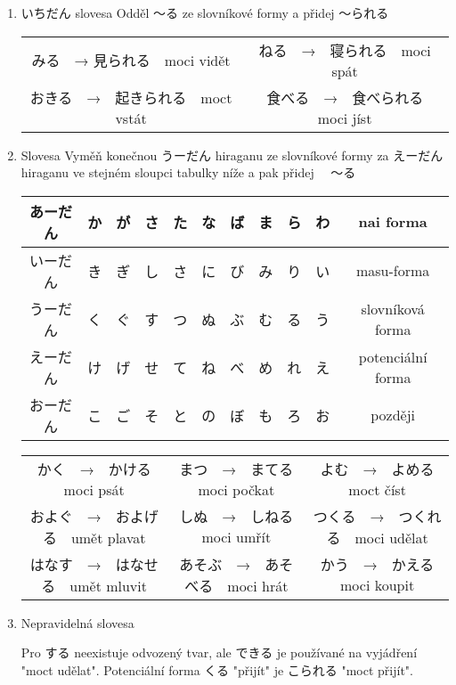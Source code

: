 \begin{enumerate}
\item  いちだん	slovesa
Odděl 〜る	 ze slovníkové formy a přidej 	〜られる	

\begin{center}
\begin{tabular}{cc}
みる　→  見られる　moci vidět& ねる　→　寝られる　moci spát\\
おきる　→　起きられる　moct vstát& 食べる　→　食べられる　moci jíst\\
\end{tabular}
\end{center}

\item 	Slovesa
Vyměň konečnou 	うーだん	hiraganu ze slovníkové formy za 	えーだん　hiraganu ve stejném sloupci tabulky níže a pak přidej 　〜る

\begin{center}
\begin{tabular}{|c|c|c|c|c|c|c|c|c|c||c}
\hline
あーだん&か&が&さ&た&な&ば&ま&ら&わ& nai forma\\
\hline
いーだん&き&ぎ&し&さ&に&び&み&り&い& masu-forma\\
\hline
うーだん&く&ぐ&す&つ&ぬ&ぶ&む&る&う& slovníková forma\\
\hline
えーだん&け&げ&せ&て&ね&べ&め&れ&え& potenciální forma\\
\hline
おーだん&こ&ご&そ&と&の&ぼ&も&ろ&お& později\\
\hline
\end{tabular}
\end{center}

\begin{center}
\begin{tabular}{ccc}
かく　→　かける　moci psát&まつ　→　まてる　moci počkat&よむ　→　よめる　moct číst\\
およぐ　→　およげる　umět plavat&しぬ　→　しねる　moci umřít&つくる　→　つくれる　moci udělat\\
はなす　→　はなせる　umět mluvit&あそぶ　→　あそべる　moci hrát&かう　→　かえる　moci koupit\\
\end{tabular}
\end{center}

\item Nepravidelná slovesa

Pro 	する	neexistuje odvozený tvar, ale 	できる	je používané na vyjádření "moct udělat". Potenciální forma 	くる	"přijít" je 	こられる	"moct přijít".

\end{enumerate}


